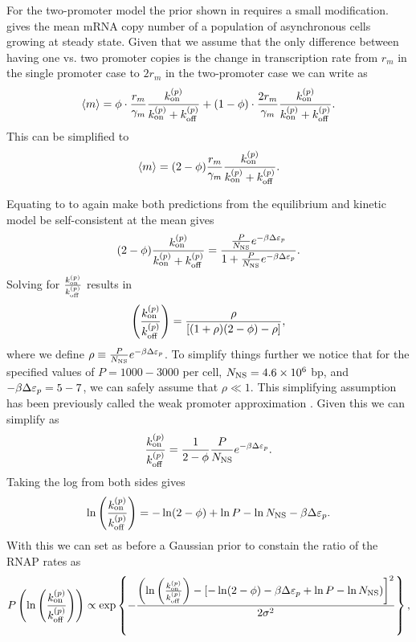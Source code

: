 For the two-promoter model the prior shown in  requires a
small modification.  gives the mean mRNA copy number of a
population of asynchronous cells growing at steady state. Given that we assume
that the only difference between having one vs. two promoter copies is the
change in transcription rate from $r_m$ in the single promoter case to $2 r_m$
in the two-promoter case we can
write  as
\begin{equation}
  \left\langle m \right\rangle = \phi \cdot {r_m \over \gamma _m} {k^{(p)}_{\text{on}}\over k^{(p)}_{\text{on}}+ k^{(p)}_{\text{off}}} +
      (1 -\phi) \cdot {2 r_m \over \gamma _m} {k^{(p)}_{\text{on}}\over k^{(p)}_{\text{on}}+ k^{(p)}_{\text{off}}}.
\end{equation}
This can be simplified to
\begin{equation}
  \left\langle m \right\rangle = (2 - \phi) {r_m \over \gamma _m} {k^{(p)}_{\text{on}} \over k^{(p)}_{\text{on}} + k^{(p)}_{\text{off}}}.
  \label{seq_mean_m_double_rates}
\end{equation}

Equating  to  to again make
both predictions from the equilibrium and kinetic model be self-consistent at
the mean gives
\begin{equation}
  (2 - \phi) {k^{(p)}_{\text{on}} \over k^{(p)}_{\text{on}} + k^{(p)}_{\text{off}}} =
  {{P \over N_\text{NS}} e^{-\beta\Delta\varepsilon_p}
  \over 1 + {P \over N_\text{NS}} e^{-\beta\Delta\varepsilon_p}}.
\end{equation}
Solving for $k^{(p)}_{\text{on}} \over k^{(p)}_{\text{off}}$ results in
\begin{equation}
  \left({k^{(p)}_{\text{on}} \over k^{(p)}_{\text{off}}}\right) =
  {\rho \over \left[ (1 + \rho)(2 - \phi) - \rho \right]},
  \label{seq_kinetic_thermo_equiv}
\end{equation}
where we define $\rho \equiv {P \over N_\text{NS}} e^{-\beta\Delta\varepsilon_p}$. To simplify things
further we notice that for the specified values of $P = 1000 - 3000$ per cell,
$N_\text{NS} = 4.6 \times 10^6$ bp, and $-\beta\Delta\varepsilon_p = 5 - 7$, we can safely assume that
$\rho \ll 1$. This simplifying assumption has been previously called the weak
promoter approximation \cite{Garcia2011c}. Given this we can simplify
 as
\begin{equation}
  {k^{(p)}_{\text{on}}\over k^{(p)}_{\text{off}}} = {1 \over 2 - \phi} {P \over N_\text{NS}} e^{-\beta\Delta\varepsilon_p}.
\end{equation}
Taking the log from both sides gives
\begin{equation}
  \ln\left({k^{(p)}_{\text{on}} \over k^{(p)}_{\text{off}}}\right) = -\ln (2 - \phi) + \ln P - \ln N_\text{NS}
  - \beta\Delta\varepsilon_p.
\end{equation}
With this we can set as before a Gaussian prior to constain the ratio of the
RNAP rates as
\begin{equation}
  P\left(\ln \left({k^{(p)}_{\text{on}} \over k^{(p)}_{\text{off}}}\right) \right)  \propto
  \exp \left\{ - {\left(\ln \left({k^{(p)}_{\text{on}} \over k^{(p)}_{\text{off}}}\right) -
  \left[-\ln(2 - \phi) -\beta\Delta\varepsilon_p + \ln P - \ln N_\text{NS} \right) \right]^2
  \over 2 \sigma^2} \right\},
  \label{seq_prior_double}
\end{equation}

